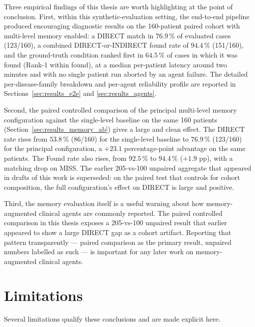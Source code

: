 Three empirical findings of this thesis are worth highlighting at the
point of conclusion. First, within this synthetic-evaluation setting,
the end-to-end pipeline produced encouraging diagnostic results on
the 160-patient paired cohort with multi-level memory enabled:
a DIRECT match in $76.9\,\%$ of evaluated cases (123/160), a combined
DIRECT-or-INDIRECT found rate of $94.4\,\%$ (151/160), and the
ground-truth condition ranked first in $64.5\,\%$ of cases in which
it was found (Rank-1 within found), at a median per-patient latency
around two minutes and with no single patient run aborted by an
agent failure. The detailed per-disease-family breakdown and
per-agent reliability profile are reported in
Sections~\ref{sec:results_e2e} and \ref{sec:results_agents}.

Second, the paired controlled comparison of the principal
multi-level memory configuration against the single-level baseline
on the same 160 patients
(Section~\ref{sec:results_memory_ab}) gives a large and clean
effect. The DIRECT rate rises from \textbf{$53.8\,\%$} (86/160) for
the single-level baseline to \textbf{$76.9\,\%$} (123/160) for the
principal configuration, a $+23.1$ percentage-point advantage on the
same patients. The Found rate also rises, from $92.5\,\%$ to
$94.4\,\%$ ($+1.9$ pp), with a matching drop on MISS. The earlier
205-vs-100 unpaired aggregate that appeared in drafts of this work
is superseded: on the paired test that controls for cohort
composition, the full configuration's effect on DIRECT is large and
positive.

Third, the memory evaluation itself is a useful warning about how
memory-augmented clinical agents are commonly reported. The paired
controlled comparison in this thesis exposes a 205-vs-100 unpaired
result that earlier appeared to show a large DIRECT gap as a cohort
artifact. Reporting that pattern transparently --- paired comparison
as the primary result, unpaired numbers labelled as such --- is
important for any later work on memory-augmented clinical agents.

\section{Limitations}
\label{sec:concl_limitations}

Several limitations qualify these conclusions and are made explicit
here.

